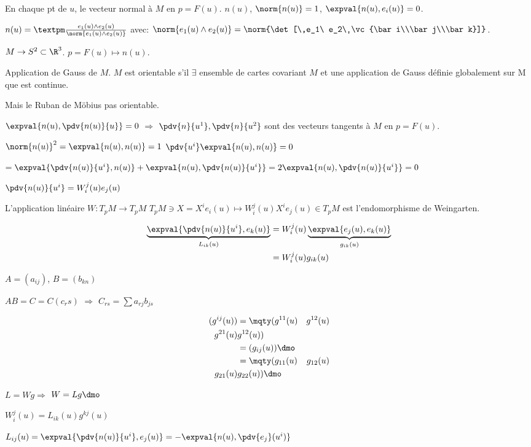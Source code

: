 En chaque pt de $u$, le vecteur normal à $M$ en $p=F(u)$. $n(u)$, $\norm{n(u)}=1$, $\expval{n(u),e_i(u)}=0$.

$n(u)=±\frac{e_1(u)\wedge e_2(u)}{\norm{e_1(u)\wedge e_2(u)}}$
avec: $\norm{e_1(u)\wedge e_2 (u)}=\norm{\det[\,e_1\ e_2\ \vc{\bar i\\\bar j\\\bar k}]}$.

$M\rightarrow S^2\subset\R^3$. $p=F(u)\mapsto n(u)$.

Application de Gauss de $M$.
$M$ est orientable s'il $\exists$ ensemble de cartes covariant $M$ et une application de Gauss définie globalement sur M que est continue.

Mais le Ruban de Möbius pas orientable.

$\expval{n(u),\pdv{n(u)}{u}}=0$ $\Rightarrow$ $\pdv{n}{u^1},\pdv{n}{u^2}$ sont des vecteurs tangents à $M$ en $p=F(u)$.

$\norm{n(u)}^2=\expval{n(u),n(u)}=1$
$\pdv{u^i}\expval{n(u),n(u)}=0$

$=\expval{\pdv{n(u)}{u^i},n(u)}+\expval{n(u),\pdv{n(u)}{u^i}}
=2\expval{n(u),\pdv{n(u)}{u^i}}=0$

$\pdv{n(u)}{u^i}=W_i^j(u)e_j(u)$

L'application linéaire $W:T_pM\rightarrow T_pM$
$T_pM\ni X=X^ie_i(u)\mapsto W_i^j(u)X^ie_j(u)\in T_pM$ est l'endomorphisme
de Weingarten.

\begin{align*}
	\underbrace{\expval{\pdv{n(u)}{u^i}, e_k(u)}}_{L_{ik}(u)} &= W_i^j(u)\underbrace{\expval{e_j(u),e_k(u)}}_{g_{ik}(u)}\\
	&= W_i^j(u)g_{ik}(u)
\end{align*}

$A=(a_{ij})$, $B=(b_{kn})$

$AB=C=C(c_rs)$ $\Rightarrow$ $C_{rs}=∑a_{rj}b_{js}$

\begin{align*}
	(g^{ij}(u))&=\mqty(g^{11}(u) & g^{12}(u)\\g^{21}(u)&g^{12}(u))\\
	&=(g_{ij}(u))\dmo\\
	&=\mqty(g_{11}(u)&g_{12}(u)\\g_{21}(u)&g_{22}(u))\dmo
\end{align*}

$L=Wg $$\Rightarrow$ $W=Lg\dmo$

$W_i^j(u)=L_{ik}(u)g^{kj}(u)$

$L_{ij}(u)=\expval{\pdv{n(u)}{u^i},e_j(u)}=-\expval{n(u),\pdv{e_j}(u^i)}$

